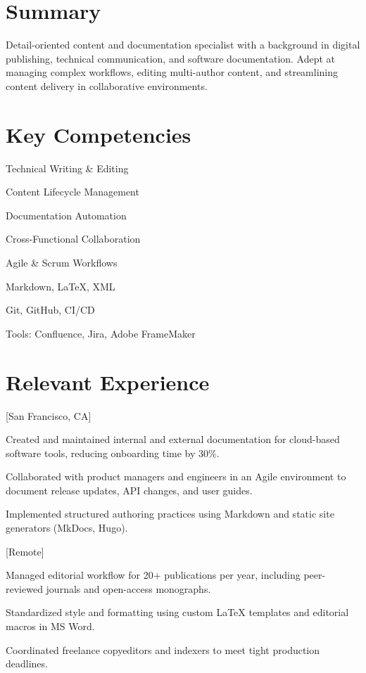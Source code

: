 \documentclass{stitched}
\begin{document}
\section{Summary}

Detail-oriented content and documentation specialist with a background in digital publishing, technical communication, and software documentation. Adept at managing complex workflows, editing multi-author content, and streamlining content delivery in collaborative environments.

\section{Key Competencies}

\begin{skills}
\item Technical Writing \& Editing
\item Content Lifecycle Management
\item Documentation Automation
\item Cross-Functional Collaboration
\item Agile \& Scrum Workflows
\item Markdown, LaTeX, XML
\item Git, GitHub, CI/CD
\item Tools: Confluence, Jira, Adobe FrameMaker
\end{skills}

\section{Relevant Experience}

[San Francisco, CA]
\begin{duties}
\item Created and maintained internal and external documentation for cloud-based software tools, reducing onboarding time by 30\%.
\item Collaborated with product managers and engineers in an Agile environment to document release updates, API changes, and user guides.
\item Implemented structured authoring practices using Markdown and static site generators (MkDocs, Hugo).
\end{duties}

[Remote]
\begin{duties}
\item Managed editorial workflow for 20+ publications per year, including peer-reviewed journals and open-access monographs.
\item Standardized style and formatting using custom LaTeX templates and editorial macros in MS Word.
\item Coordinated freelance copyeditors and indexers to meet tight production deadlines.
\end{duties}
\end{document}
